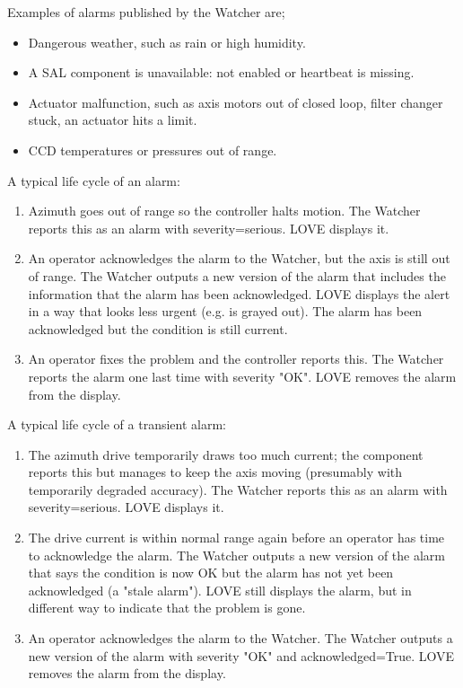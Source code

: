 Examples of alarms published by the Watcher are;
%
\begin{itemize}
\item Dangerous weather, such as rain or high humidity.
\item A SAL component is unavailable: not enabled or heartbeat is missing.
\item Actuator malfunction, such as axis motors out of closed loop, filter changer stuck, an actuator hits a limit.
\item CCD temperatures or pressures out of range.
\end{itemize}

A typical life cycle of an alarm:
\begin{enumerate}
\item Azimuth goes out of range so the controller halts motion. The Watcher reports this as an alarm with severity=serious. LOVE displays it.
\item An operator acknowledges the alarm to the Watcher, but the axis is still out of range. The Watcher outputs a new version of the alarm that includes the information that the alarm has been acknowledged. LOVE displays the alert in a way that looks less urgent (e.g. is grayed out). The alarm has been acknowledged but the condition is still current.
\item An operator fixes the problem and the controller reports this. The Watcher reports the alarm one last time with severity "OK". LOVE removes the alarm from the display.
\end{enumerate}

A typical life cycle of a transient alarm:
\begin{enumerate}
\item The azimuth drive temporarily draws too much current; the component reports this but manages to keep the axis moving (presumably with temporarily degraded accuracy). The Watcher reports this as an alarm with severity=serious. LOVE displays it.
\item The drive current is within normal range again before an operator has time to acknowledge the alarm. The Watcher outputs a new version of the alarm that says the condition is now OK but the alarm has not yet been acknowledged (a "stale alarm"). LOVE still displays the alarm, but in different way to indicate that the problem is gone.
\item An operator acknowledges the alarm to the Watcher. The Watcher outputs a new version of the alarm with severity "OK" and acknowledged=True. LOVE removes the alarm from the display.
\end{enumerate}


